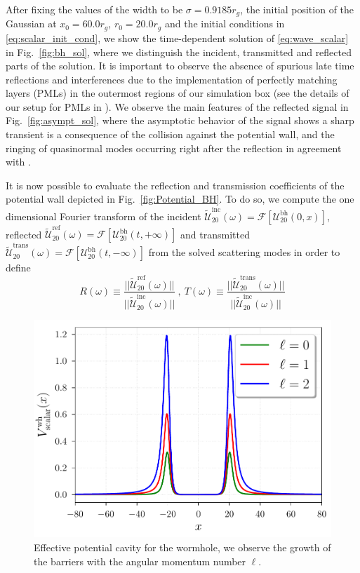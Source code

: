 \documentclass[article,aps,nofootinbib,twocolumn,superscriptaddress]{revtex4-1}
\begin{document}
After fixing the values of the width to be $\sigma=0.9185r_g$, the initial position of the Gaussian at $x_0=60.0r_g$, $r_0=20.0r_g$ and the initial conditions in \eqref{eq:scalar_init_cond}, we show the time-dependent solution of \eqref{eq:wave_scalar} in Fig.~\ref{fig:bh_sol}, where we distinguish the incident, transmitted and reflected parts of the solution. It is important to observe the absence of spurious late time reflections and interferences due to the implementation of perfectly matching layers (PMLs) in the outermost regions of our simulation box (see the details of our setup for PMLs in \citep{Frolov:2017asg}). We observe the main features of the reflected signal in Fig.~\ref{fig:asympt_sol}, where the asymptotic behavior of the signal shows a sharp transient is a consequence of the collision against the potential wall, and the ringing of quasinormal modes occurring right after the reflection in agreement with \citep{Petrich:1985csm}. 

It is now possible to evaluate the reflection and transmission coefficients of the potential wall depicted in Fig.~\ref{fig:Potential_BH}. To do so, we compute the one dimensional Fourier transform of the incident $\tilde{\mathcal{U}}_{20}^{\mathrm{inc}}(\omega)=\mathcal{F}[\mathcal{U}^{\mathrm{bh}}_{20}(0,x)]$, reflected $\tilde{\mathcal{U}}_{20}^{\mathrm{ref}}(\omega)=\mathcal{F}[\mathcal{U}^{\mathrm{bh}}_{20}(t,+\infty)]$ and transmitted $\tilde{\mathcal{U}}_{20}^{\mathrm{trans}}(\omega)=\mathcal{F}[\mathcal{U}^{\mathrm{bh}}_{20}(t,-\infty)]$ from the solved scattering modes in order to define
\begin{equation}
R(\omega)\equiv \frac{||\tilde{\mathcal{U}}_{20}^{\mathrm{ref}}(\omega)||}{||\tilde{\mathcal{U}}_{20}^{\mathrm{inc}}(\omega)||}~,~T(\omega)\equiv \frac{||\tilde{\mathcal{U}}_{20}^{\mathrm{trans}}(\omega)||}{||\tilde{\mathcal{U}}_{20}^{\mathrm{inc}}(\omega)||}
\label{eq:ref_and_trans}
\end{equation}
\begin{figure}[t]
\centering
\includegraphics[width=.4\textwidth]{figures/potential_scalar.pdf}
\caption{\label{fig:potential_wh} Effective potential cavity for the wormhole, we observe the growth of the barriers with the angular momentum number $\ell$.}
\end{figure}
\end{document}
